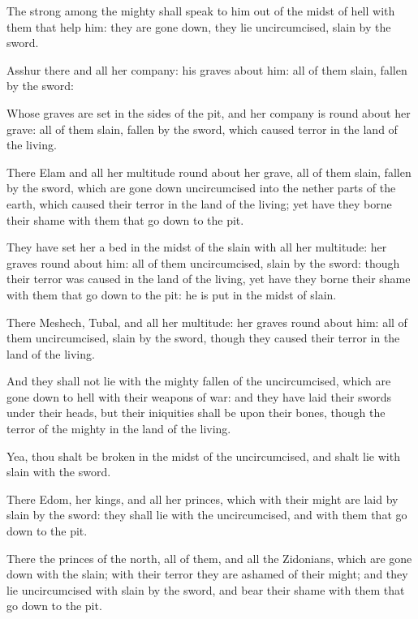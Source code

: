 {The
strong among the
mighty shall
speak to him out of the
midst of
hell with them that
help him: they are gone
down, they
lie
uncircumcised,
slain by the
sword.

Asshur
{} there and all her
company: his
graves
{}
about him: all of them
slain,
fallen by the
sword:

Whose
graves are
set in the
sides of the
pit, and her
company is round
about her
grave: all of them
slain,
fallen by the
sword, which
caused
terror in the
land of the
living.

There
{}
Elam and all her
multitude round
about her
grave, all of them
slain,
fallen by the
sword, which are gone
down
uncircumcised into the nether
parts of the
earth, which
caused their
terror in the
land of the
living; yet have they
borne their
shame with them that go
down to the
pit.

They have
set her a
bed in the
midst of the
slain with all her
multitude: her
graves
{} round
about him: all of them
uncircumcised,
slain by the
sword: though their
terror was
caused in the
land of the
living, yet have they
borne their
shame with them that go
down to the
pit: he is
put in the
midst of
{}
slain.

There
{}
Meshech,
Tubal, and all her
multitude: her
graves
{} round
about him: all of them
uncircumcised,
slain by the
sword, though they
caused their
terror in the
land of the
living.

And they shall not
lie with the
mighty
{}
fallen of the
uncircumcised, which are gone
down to
hell with their
weapons of
war: and they have
laid their
swords under their
heads, but their
iniquities shall be upon their
bones, though
{} the
terror of the
mighty in the
land of the
living.

Yea, thou shalt be
broken in the
midst of the
uncircumcised, and shalt
lie with
{}
slain with the
sword.

There
{}
Edom, her
kings, and all her
princes, which with their
might are
laid by
{}
slain by the
sword: they shall
lie with the
uncircumcised, and with them that go
down to the
pit.

There
{} the
princes of the
north, all of them, and all the
Zidonians, which are gone
down with the
slain; with their
terror they are
ashamed of their
might; and they
lie
uncircumcised with
{}
slain by the
sword, and
bear their
shame with them that go
down to the
pit.

}

